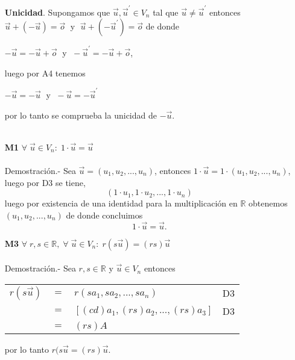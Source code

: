 \begin{enumerate}
    \textbf{Unicidad}. Supongamos que $\vec{u},\vec{u}^{'} \in V_n$ tal que $\vec{u}\neq \vec{u}^{'}$ entonces $\vec{u}+(-\vec{u}) = \vec{o}\; $ y $\; \vec{u}+(-\vec{u}^{'}) = \vec{o}$ de donde \begin{center} $-\vec{u} = -\vec{u} + \vec{o}\; $ y $\; -\vec{u}^{'} = -\vec{u} + \vec{o}$,\end{center} luego por A4 tenemos \begin{center} $-\vec{u} = -\vec{u}\;$ y $\; -\vec{u} = -\vec{u}^{'}$ \end{center}
    por lo tanto se comprueba la unicidad de $-\vec{u}$.\\\\ 

\item [\large\bfseries M1] $\forall\; \vec{u} \in V_n:\;  1\cdot \vec{u} = \vec{u}$\\\\
    Demostración.-\; Sea $\vec{u} = (u_1,u_2,...,u_n)$, entonces $1\cdot \vec{u} = 1\cdot (u_1,u_2,...,u_n)$, luego por D3 se tiene, $$(1\cdot u_1,1\cdot u_2,...,1\cdot u_n)$$
    luego por existencia de una identidad para la multiplicación en $\mathbb{R}$ obtenemos $(u_1,u_2,...,u_n)$ de donde concluimos $$1\cdot \vec{u} = \vec{u}.$$

\item [\large\bfseries M3] $\forall\; r,s \in \mathbb{R}, \; \forall\; \vec{u} \in V_n:\; r(s \vec{u}) = (rs)\vec{u}$\\\\
    Demostración.-\; Sea $r,s \in \mathbb{R}$ y $\vec{u}\in V_n$ entonces 
	\begin{center}
	    \begin{tabular}{rcll}
		$r(s\vec{u})$&$=$&$r(sa_1,sa_2,...,sa_n)$&D3\\
		&$=$&$\left[(cd)a_1,(rs)a_2,...,(rs)a_3\right]$&D3\\
		&$=$&$(rs)A$&\\
	    \end{tabular}
	\end{center}
	por lo tanto $r(s\vec{u} = (rs)\vec{u}$.\\\\


\end{enumerate}
